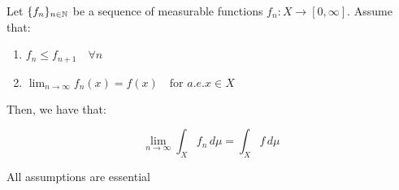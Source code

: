 \begin{ftheorem}
    Let $\{f_n\}_{n \in \mathbb{N}}$ be a sequence of measurable functions $f_n: X \to [0, \infty]$.
    Assume that:
    \vspace{1em}
    \begin{enumerate}[label=(\roman*)]
        \item $f_n \leq f_{n+1} \quad \forall n$
        \vspace{1em}
        \item $\lim_{n \to \infty} f_n(x) = f(x) \quad \text{for } a.e. x \in X$
        \vspace{1em}
    \end{enumerate}

    Then, we have that:

    $$\lim_{n \to \infty} \int_{X} f_n \, d\mu = \int_{X} f \, d\mu$$

\end{ftheorem}

\begin{fremark}
    All assumptions are essential
\end{fremark}

